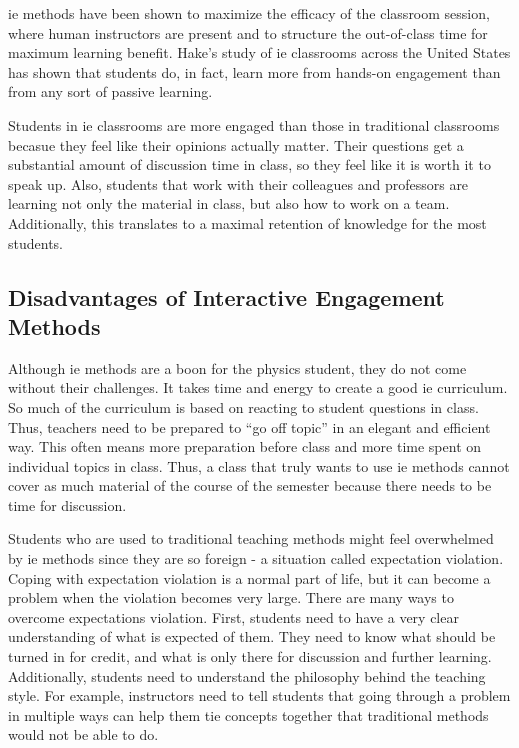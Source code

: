 \gls{ie} methods have been shown to maximize the efficacy of the classroom session, where human instructors are present and to structure the out-of-class time for maximum learning benefit. Hake's study of \gls{ie} classrooms across the United States has shown that students do, in fact, learn more from hands-on engagement than from any sort of passive learning.

Students in \gls{ie} classrooms are more engaged than those in traditional classrooms becasue they feel like their opinions actually matter. Their questions get a substantial amount of discussion time in class, so they feel like it is worth it to speak up. Also, students that work with their colleagues and professors are learning not only the material in class, but also how to work on a team. Additionally, this translates to a maximal retention of knowledge for the most students\cite{novak1999}.

\subsection{Disadvantages of Interactive Engagement Methods}

Although \gls{ie} methods are a boon for the physics student, they do not come without their challenges. It takes time and energy to create a good \gls{ie} curriculum. So much of the curriculum is based on reacting to student questions in class. Thus, teachers need to be prepared to ``go off topic'' in an elegant and efficient way. This often means more preparation before class and more time spent on individual topics in class. Thus, a class that truly wants to use \gls{ie} methods cannot cover as much material of the course of the semester because there needs to be time for discussion.

Students who are used to traditional teaching methods might feel overwhelmed by \gls{ie} methods since they are so foreign - a situation called expectation violation. Coping with expectation violation is a normal part of life, but it can become a problem when the violation becomes very large. There are many ways to overcome expectations violation. First, students need to have a very clear understanding of what is expected of them. They need to know what should be turned in for credit, and what is only there for discussion and further learning. Additionally, students need to understand the philosophy behind the teaching style. For example, instructors need to tell students that going through a problem in multiple ways can help them tie concepts together that traditional methods would not be able to do.

